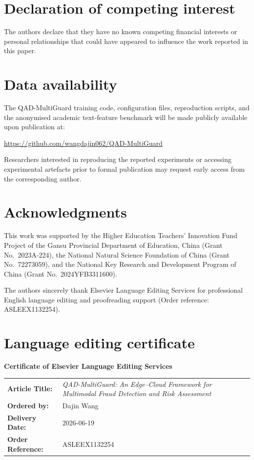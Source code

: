 \documentclass[a4paper,fleqn]{cas-sc}
\begin{document}
\section*{Declaration of competing interest}

The authors declare that they have no known competing financial interests or personal relationships that could have appeared to influence the work reported in this paper.

\section*{Data availability}

The QAD-MultiGuard training code, configuration files, reproduction scripts, and the anonymised academic text-feature benchmark will be made publicly available upon publication at:

\url{https://github.com/wangdajin062/QAD-MultiGuard}

Researchers interested in reproducing the reported experiments or accessing experimental artefacts prior to formal publication may request early access from the corresponding author.

\section*{Acknowledgments}

This work was supported by the Higher Education Teachers' Innovation Fund Project of the Gansu Provincial Department of Education, China (Grant No.~2023A-224), the National Natural Science Foundation of China (Grant No.~72273059), and the National Key Research and Development Program of China (Grant No.~2024YFB3311600).

The authors sincerely thank Elsevier Language Editing Services for professional English language editing and proofreading support (Order reference: ASLEEX1132254).

\section*{Language editing certificate}

\noindent
\textbf{Certificate of Elsevier Language Editing Services}

\vspace{0.6em}

\renewcommand{\arraystretch}{1.2}

\begin{tabular}{p{4.2cm} p{10cm}}
\textbf{Article Title:} &
\textit{QAD-MultiGuard: An Edge--Cloud Framework for Multimodal Fraud Detection and Risk Assessment} \\
\textbf{Ordered by:} &
Dajin Wang \\
\textbf{Delivery Date:} &
2026-06-19 \\
\textbf{Order Reference:} &
ASLEEX1132254 \\
\end{tabular}
\end{document}
